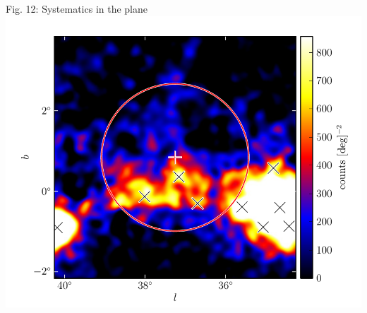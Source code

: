 \documentclass[12pt]{beamer}
\begin{document}
\begin{frame}{Fig. 12: Systematics in the plane}
  \includegraphics[scale=0.5]{plots/example_bad_fit_color.pdf}
\end{frame}
\end{document}
